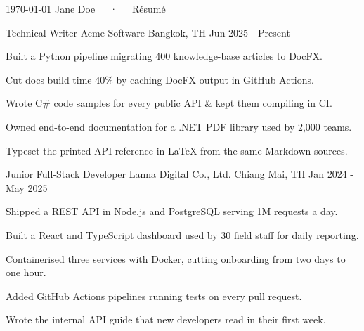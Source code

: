 \documentclass[11pt, a4paper]{awesome-cv}
\begin{document}
\makecvheader[C]

\makecvfooter
  {\today}
  {Jane Doe~~~·~~~Résumé}
  {\thepage}


\begin{cventries}

  \cventry
    {Technical Writer} %
    {Acme Software} %
    {Bangkok, TH} %
    {Jun 2025 - Present} %
    {
      \begin{cvitems} %
        \item {Built a Python pipeline migrating 400 knowledge-base articles to DocFX.} %
        \item {Cut docs build time 40\% by caching DocFX output in GitHub Actions.} %
        \item {Wrote C\# code samples for every public API \& kept them compiling in CI.} %
        \item {Owned end-to-end documentation for a .NET PDF library used by 2,000 teams.} %
        \item {Typeset the printed API reference in LaTeX from the same Markdown sources.} %
      \end{cvitems}
    }

  \cventry
    {Junior Full-Stack Developer} %
    {Lanna Digital Co., Ltd.} %
    {Chiang Mai, TH} %
    {Jan 2024 - May 2025} %
    {
      \begin{cvitems} %
        \item {Shipped a REST API in Node.js and PostgreSQL serving 1M requests a day.} %
        \item {Built a React and TypeScript dashboard used by 30 field staff for daily reporting.} %
        \item {Containerised three services with Docker, cutting onboarding from two days to one hour.} %
        \item {Added GitHub Actions pipelines running tests on every pull request.} %
        \item {Wrote the internal API guide that new developers read in their first week.} %
      \end{cvitems}
    }

\end{cventries}
\end{document}
